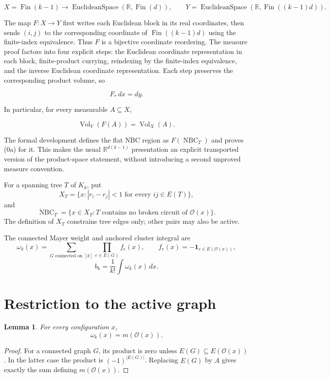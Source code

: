 \documentclass[11pt]{article}
\newtheorem{lemma}{Lemma}
\newcommand{\NBC}{\operatorname{NBC}}
\newcommand{\Vol}{\operatorname{Vol}}
\newcommand{\calO}{\mathcal{O}}
\newcommand{\1}{\mathbf{1}}
\begin{document}
\[
 X=\operatorname{Fin}(k-1)\to\operatorname{EuclideanSpace}(\mathbb{R},
     \operatorname{Fin}(d)),\qquad
 Y=\operatorname{EuclideanSpace}(\mathbb{R},\operatorname{Fin}((k-1)d)).
\]

The map $F:X\to Y$ first writes each Euclidean block in its real
coordinates, then sends $(i,j)$ to the corresponding coordinate of
\(\operatorname{Fin}((k-1)d)\) using the finite-index equivalence.
Thus $F$ is a bijective coordinate reordering.  The measure proof factors
into four explicit steps: the Euclidean coordinate representation in each
block, finite-product currying, reindexing by the finite-index equivalence,
and the inverse Euclidean coordinate representation.  Each step preserves
the corresponding product volume, so

\[
 F_*\,dx=dy.
\tag{0}
\]

In particular, for every measurable $A\subseteq X$,

\[
 \Vol_Y(F(A))=\Vol_X(A).
\tag{0a}
\]

The formal development defines the flat NBC region as $F(\NBC_T)$ and proves
(0a) for it.  This makes the usual $\mathbb{R}^{d(k-1)}$ presentation an
explicit transported version of the product-space statement, without
introducing a second unproved measure convention.

For a spanning tree $T$ of $K_k$, put
\[
 X_T=\{x:|r_i-r_j|<1\text{ for every }ij\in E(T)\},
\]
and
\[
 \NBC_T=\{x\in X_T:T\text{ contains no broken circuit of }\calO(x)\}.
\]
The definition of $X_T$ constrains tree edges only; other pairs may also be
active.

The connected Mayer weight and anchored cluster integral are
\[
 \omega_k(x)=\sum_{G\text{ connected on }[k]}
       \prod_{e\in E(G)}f_e(x),
 \qquad f_e(x)=-\1_{e\in E(\calO(x))},
\]
\[
 b_k=\frac{1}{k!}\int\omega_k(x)\,dx.
\]

\section{Restriction to the active graph}

\begin{lemma}
For every configuration $x$,
\[
 \omega_k(x)=m(\calO(x)).
\]
\end{lemma}

\begin{proof}
For a connected graph $G$, its product is zero unless
$E(G)\subseteq E(\calO(x))$.  In the latter case the product is
$(-1)^{|E(G)|}$.  Replacing $E(G)$ by $A$ gives exactly the sum defining
$m(\calO(x))$.
\end{proof}
\end{document}
